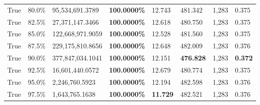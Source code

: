 \begin{table}[H]
\begin{tabular}{lllrllll}
\cline{1-8}
True & 80.0\% & 95,534,691.3789 & \bfseries \color{red} 100.0000\% & 12.743 & 481.342 & 1,283 & 0.375 \\
\cline{1-8}
True & 82.5\% & 27,371,147.3466 & \bfseries \color{red} 100.0000\% & 12.618 & 480.750 & 1,283 & 0.375 \\
\cline{1-8}
True & 85.0\% & 122,668,971.9059 & \bfseries \color{red} 100.0000\% & 12.528 & 481.560 & 1,283 & 0.375 \\
\cline{1-8}
True & 87.5\% & 229,175,810.8656 & \bfseries \color{red} 100.0000\% & 12.648 & 482.009 & 1,283 & 0.376 \\
\cline{1-8}
True & 90.0\% & 377,847,034.1041 & \bfseries \color{red} 100.0000\% & 12.151 & \bfseries \color{red} 476.828 & 1,283 & \bfseries \color{red} 0.372 \\
\cline{1-8}
True & 92.5\% & 16,601,440.0572 & \bfseries \color{red} 100.0000\% & 12.679 & 480.774 & 1,283 & 0.375 \\
\cline{1-8}
True & 95.0\% & 2,246,760.5923 & \bfseries \color{red} 100.0000\% & 12.194 & 482.598 & 1,283 & 0.376 \\
\cline{1-8}
True & 97.5\% & 1,643,765.1638 & \bfseries \color{red} 100.0000\% & \bfseries \color{red} 11.729 & 482.521 & 1,283 & 0.376 \\
\cline{1-8}
\bottomrule
\end{tabular}
\end{table}
